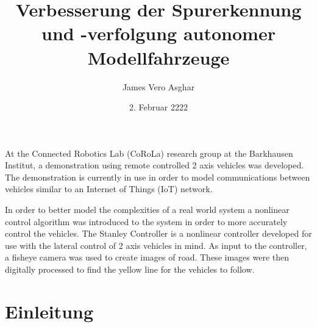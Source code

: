 \documentclass[arbeit=studie,oneside,BCOR=12mm]{ArbeitRST}
\begin{document}

\author{James Vero Asghar}



\title{Verbesserung der Spurerkennung und -verfolgung autonomer Modellfahrzeuge}

\subtitle{}


\date{2. Februar 2222}


\pagestyle{plain}


\maketitle



\selbststaendigkeitserklaerung


{At the Connected Robotics Lab (CoRoLa) research group at the Barkhausen
Institut, a demonstration using remote controlled 2 axis vehicles was
developed. The demonstration is currently in use in order to model
communications between vehicles similar to an Internet of Things (IoT) network.

In order to better model the complexities of a real world system a nonlinear
control algorithm was introduced to the system in order to more accurately
control the vehicles. The Stanley Controller is a nonlinear controller
developed for use with the lateral control of 2 axis vehicles in mind. As input
to the controller, a fisheye camera was used to create images of road. These
images were then digitally processed to find the yellow line for the vehicles
to follow.}


\tableofcontents
{}
\listoffigures

\chapter{Einleitung}
\end{document}
